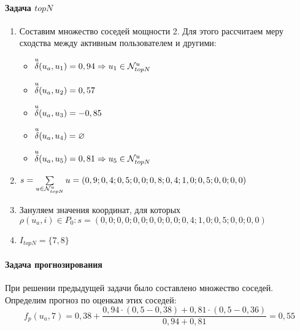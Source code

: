 \paragraph{Задача $topN$}
\begin{enumerate}
\item Составим множество соседей мощности 2. Для этого рассчитаем меру сходства между активным пользователем и другими:
  \begin{itemize}
  \item ${\overset{u}{\mathcal{\delta}}}(u_a,u_1) = 0,94 \Rightarrow u_1 \in {\mathcal{N}^u_{topN}}$
  \item ${\overset{u}{\mathcal{\delta}}}(u_a,u_2) = 0,57$
  \item ${\overset{u}{\mathcal{\delta}}}(u_a,u_3) = -0,85$
  \item ${\overset{u}{\mathcal{\delta}}}(u_a,u_4) = \varnothing$
  \item ${\overset{u}{\mathcal{\delta}}}(u_a,u_5) = 0,81 \Rightarrow u_5 \in {\mathcal{N}^u_{topN}}$
  \end{itemize}
\item $s = \sum \limits_{u \in {\mathcal{N}^u_{topN}}} u = (0,9; 0,4; 0,5; 0,0; 0,8; 0,4; 1,0; 0,5; 0,0; 0,0)$
\item Зануляем значения координат, для которых $\rho(u_a, i) \in P_0: s =
	(0,0; 0,0; 0,0; 0,0; 0,0;0,4; 1,0; 0,5; 0,0; 0,0)$
\item $I_{topN} = \{ 7, 8 \}$
\end{enumerate}
\paragraph{Задача прогнозирования}
При решении предыдущей задачи было составлено множество соседей.
Определим прогноз по оценкам этих соседей:
\begin{equation}
f_p(u_a,7) =  0,38 + \frac{ 0,94 \cdot (0,5 - 0,38) + 0,81 \cdot (0,5 - 0,36)}{
	0,94 + 0,81 } = 0,55
\end{equation}
